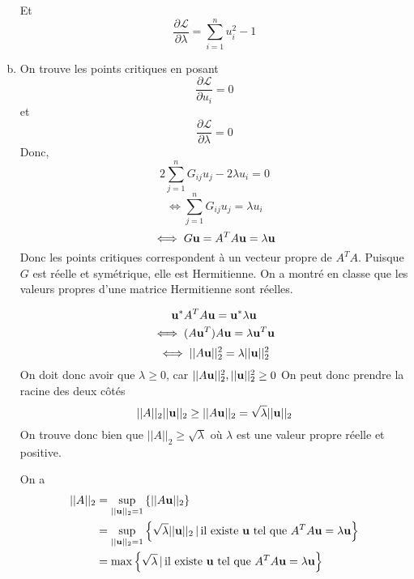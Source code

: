 \documentclass[letterpaper,12pt,oneside,final]{book}
\begin{document}
\begin{enumerate}[a)]
Et
\[ \frac{\partial \mathcal{L}}{\partial \lambda} = \sum_{i=1}^{n} u_{i}^{2}-1 \]
\item %
On trouve les points critiques en posant 
\[ \frac{\partial \mathcal{L}}{\partial u_{i}}  = 0  \]
et 
\[  \frac{\partial \mathcal{L}}{\partial \lambda}  = 0 \]
Donc, 
\[ 2 \sum_{j=1}^{n} G_{ij}u_{j} - 2\lambda u_{i} = 0 \]
\[ \iff \sum_{j=1}^{n} G_{ij}u_{j} = \lambda u_{i} \]
\[ \iff G \vb{u} = A^{T}A \vb{u}= \lambda \vb{u} \]
Donc les points critiques correspondent à un vecteur propre de \( A^{T}A \). 
Puisque \( G \) est réelle et symétrique, elle est Hermitienne. On a montré en classe que les 
valeurs propres d'une matrice Hermitienne sont réelles.

\[ \vb{u^{*}} A^{T}A \vb{u} = \vb{u}^{*}\lambda \vb{u}  \]
\[ \iff (A\vb{u}^{T})A\vb{u} = \lambda \vb{u}^{T}\vb{u} \]
\[ \iff \lvert \lvert  A\vb{u} \rvert \rvert_{2}^{2} = \lambda \lvert \lvert  \vb{u} \rvert \rvert_{2}^{2} \]
On doit donc avoir que \( \lambda \geq  0 \), car \( \lvert \lvert  A\vb{u} \rvert \rvert_{2}^{2}, \lvert \lvert  \vb{u} \rvert \rvert_{2}^{2} \geq 0 \)
On peut donc prendre la racine des deux côtés 
\[ \lvert \lvert A \rvert \rvert_{2} \lvert \lvert  \vb{u} \rvert \rvert_{2} \geq \lvert \lvert A\vb{u} \rvert \rvert _{2} = \sqrt{\lambda} \lvert \lvert  \vb{u} \rvert \rvert_{2}  \]
On trouve donc bien que \( \lvert \lvert  A \rvert \rvert_{2} \geq \sqrt{\lambda} \) où \( \lambda \) est une valeur propre réelle et positive. 

On a 
\begin{equation*}
\begin{split}
    \lvert \lvert  A \rvert \rvert_{2} & = \sup_{\lvert \lvert  \vb{u} \rvert \rvert_{2} = 1}   \left\{\lvert \lvert  A\vb{u} \rvert \rvert_{2}\right\}\\ 
& = \sup_{\lvert \lvert  \vb{u} \rvert \rvert_{2} = 1} \left\{\sqrt{\lambda}\lvert \lvert  \vb{u} \rvert \rvert_{2}\,|\, \text{il existe } \vb{u} \text{ tel que } A^{T}A\vb{u} = \lambda \vb{u}\right\}\\
& = \max\left\{\sqrt{\lambda}\,|\,\text{il existe } \vb{u} \text{ tel que } A^{T}A\vb{u} = \lambda \vb{u}\right\}\\ 
\end{split}
\end{equation*}



\end{enumerate}
\end{document}
